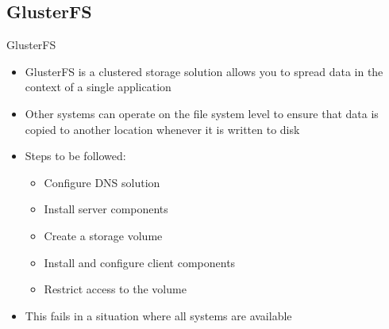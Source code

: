 \documentclass[10pt,xcolor=dvipsnames]{beamer}
\begin{document}
\subsection{GlusterFS}

\begin{frame}{GlusterFS}
\begin{itemize}
\item GlusterFS is a clustered storage solution allows you to spread data in the context of a single application
\item Other systems can operate on the file system level to ensure that data is copied to another location whenever it is written to disk
\item Steps to be followed:
\begin{itemize}
 	\item  Configure DNS solution
	\item Install server components
	\item Create a storage volume
 	\item Install and configure client components
	\item Restrict access to the volume
\end{itemize}
\item  This fails in a situation where all systems are available
\end{itemize}
\end{frame}
\end{document}
